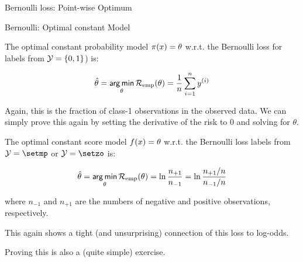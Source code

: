 \begin{vbframe}{Bernoulli loss: Point-wise Optimum}




\end{vbframe}



\begin{vbframe}{Bernoulli: Optimal constant Model}

The optimal constant probability model $\pi(x) = \theta$ w.r.t. the Bernoulli loss for labels from $\mathcal{Y} = \{0, 1\}$) is:

\begin{eqnarray*}
  \hat{\theta} = \mathop{\sf arg\,min}_{\theta} \mathcal{R}_{\text{emp}}(\theta) = \frac{1}{n} \sum_{i=1}^n y^{(i)}
\end{eqnarray*}

Again, this is the fraction of class-1 observations in the observed data.
We can simply prove this again by setting the derivative of the risk to 0 and solving for $\theta$.

\framebreak

The optimal constant score model $f(x) = \theta$ w.r.t. the Bernoulli loss labels from $\Yspace = \setmp$ or $\Yspace = \setzo$ is:

\begin{eqnarray*}
  \hat{\theta} = \mathop{\sf arg\,min}_{\theta} \mathcal{R}_{\text{emp}}(\theta) = \ln \frac{n_{+1}}{n_{-1}} = \ln \frac{n_{+1}/n}{n_{-1}/n} 
\end{eqnarray*}

where $n_{-1}$ and $n_{+1}$ are the numbers of negative and positive observations, respectively.

\lz

This again shows a tight (and unsurprising) connection of this loss to log-odds.

\lz

Proving this is also a (quite simple) exercise.

\end{vbframe}

